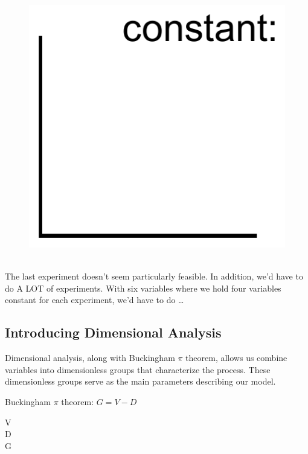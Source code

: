 \documentclass[paper=a4, fontsize=12pt]{scrartcl} %
\numberwithin{equation}{section} %
\numberwithin{figure}{section} %
\numberwithin{table}{section} %
\begin{document}
\begin{figure}[ht]
\begin{minipage}[b]{0.3\linewidth}
\end{minipage}
\quad
\begin{minipage}[b]{0.3\linewidth}
\includegraphics[scale=0.5]{experiment.pdf}
\end{minipage}
\end{figure}
\\
The last experiment doesn't seem particularly feasible. In addition, we'd have to do A LOT of experiments. With six variables where we hold four variables constant for each experiment, we'd have to do \ldots

\vspace{3cm} \subsection*{Introducing Dimensional Analysis}

Dimensional analysis, along with Buckingham $\pi$ theorem, allows us combine variables into dimensionless groups that characterize the process. These dimensionless groups serve as the main parameters describing our model. 

\vspace{2ex}

Buckingham $\pi$ theorem: $G=V-D$ 

\begin{description}
  \item[V] 
  \item[D] 
  \item[G] 
\end{description}
\end{document}
